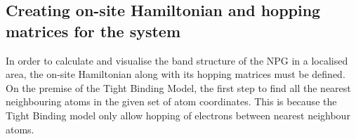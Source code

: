\subsection{Creating on-site Hamiltonian and hopping matrices for the system}
In order to calculate and visualise the band structure of the NPG in a localised area, the on-site Hamiltonian along with its hopping matrices must be defined. On the premise of the Tight Binding Model, the first step to find all the nearest neighbouring atoms in the given set of atom coordinates. This is because the Tight Binding model only allow hopping of electrons between nearest neighbour atoms. 
